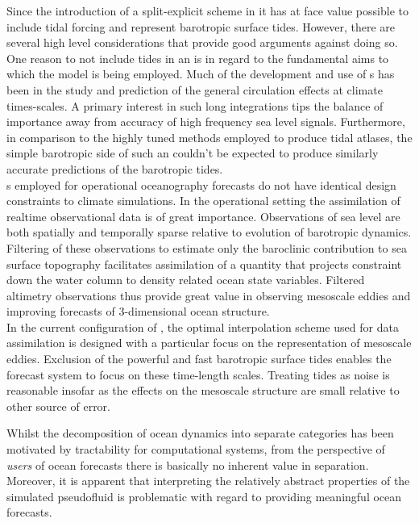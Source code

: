 Since the introduction of a split-explicit scheme in \MOM{} it has at face value possible to include tidal forcing and represent barotropic surface tides.   However, there are several high level considerations that provide good arguments against doing so.\\
One reason to not include tides in an \OGCM{} is in regard to the fundamental aims to which the model is being employed.  Much of the development and use of \OGCM{}s has been in the study and prediction of the general circulation effects at climate times-scales.  A primary interest in such long integrations tips the balance of importance away from accuracy of high frequency sea level signals.   Furthermore, in comparison to the highly tuned methods employed to produce tidal atlases, the simple barotropic side of such an \OGCM{} couldn't be expected to produce similarly accurate predictions of the barotropic tides.\\

\OGCM{}s employed for operational oceanography forecasts do not have identical design constraints to climate simulations.  In the operational setting the assimilation of realtime observational data is of great importance.  Observations of sea level are both spatially and temporally sparse relative to evolution of barotropic dynamics.   Filtering of these observations to estimate only the baroclinic contribution to sea surface topography facilitates assimilation of a quantity that projects constraint down the water column to density related ocean state variables.   Filtered altimetry observations thus provide great value in observing mesoscale eddies and improving forecasts of 3-dimensional ocean structure.\\
In the current configuration of \BL{}, the optimal interpolation scheme used for data assimilation is designed with a particular focus on the representation of mesoscale eddies.   Exclusion of the powerful and fast barotropic surface tides enables the forecast system to focus on these time-length scales.   Treating tides as noise is reasonable insofar as the effects on the mesoscale structure are small relative to other source of error.



Whilst the decomposition of ocean dynamics into separate categories has been motivated by tractability for computational systems, from the perspective of \emph{users} of ocean forecasts there is basically no inherent value in separation.   Moreover, it is apparent that interpreting the relatively abstract properties of the simulated pseudofluid is problematic with regard to providing meaningful ocean forecasts. 

